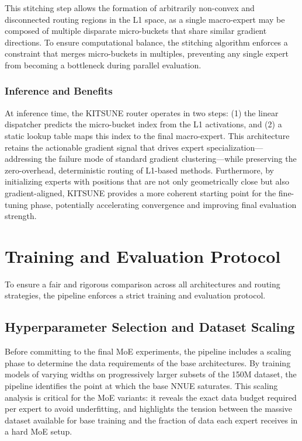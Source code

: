 This stitching step allows the formation of arbitrarily non-convex and disconnected routing regions in the L1 space, as a single macro-expert may be composed of multiple disparate micro-buckets that share similar gradient directions. To ensure computational balance, the stitching algorithm enforces a constraint that merges micro-buckets in multiples, preventing any single expert from becoming a bottleneck during parallel evaluation.

\subsubsection*{Inference and Benefits}
At inference time, the KITSUNE router operates in two steps: (1) the linear dispatcher predicts the micro-bucket index from the L1 activations, and (2) a static lookup table maps this index to the final macro-expert. This architecture retains the actionable gradient signal that drives expert specialization—addressing the failure mode of standard gradient clustering—while preserving the zero-overhead, deterministic routing of L1-based methods. Furthermore, by initializing experts with positions that are not only geometrically close but also gradient-aligned, KITSUNE provides a more coherent starting point for the fine-tuning phase, potentially accelerating convergence and improving final evaluation strength.


\section{Training and Evaluation Protocol}

To ensure a fair and rigorous comparison across all architectures and routing strategies, the pipeline enforces a strict training and evaluation protocol.

\subsection{Hyperparameter Selection and Dataset Scaling}

Before committing to the final MoE experiments, the pipeline includes a scaling phase to determine the data requirements of the base architectures. By training models of varying widths on progressively larger subsets of the 150M dataset, the pipeline identifies the point at which the base NNUE saturates. This scaling analysis is critical for the MoE variants: it reveals the exact data budget required per expert to avoid underfitting, and highlights the tension between the massive dataset available for base training and the fraction of data each expert receives in a hard MoE setup.

